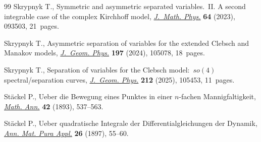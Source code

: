 \documentclass[10pt,a4paper]{amsart}
\numberwithin{equation}{section}
\begin{document}
\begin{thebibliography}{99}
Skrypnyk T., Symmetric and asymmetric separated variables.~{II}. {A} second
 integrable case of the complex {K}irchhoff model,
 \href{https://doi.org/10.1063/5.0152882}{\textit{J.~Math. Phys.}} \textbf{64}
 (2023), 093503, 21~pages.

Skrypnyk T., Asymmetric separation of variables for the extended {C}lebsch and
 {M}anakov models,
 \href{https://doi.org/10.1016/j.geomphys.2023.105078}{\textit{J.~Geom.
 Phys.}} \textbf{197} (2024), 105078, 18~pages.

Skrypnyk T., Separation of variables for the {C}lebsch model:~{$so(4)$}
 spectral/separation curves,
 \href{https://doi.org/10.1016/j.geomphys.2025.105453}{\textit{J.~Geom.
 Phys.}} \textbf{212} (2025), 105453, 11~pages.

St\"ackel P., Ueber die {B}ewegung eines {P}unktes in einer {$n$}-fachen
 {M}annigfaltigkeit, \href{https://doi.org/10.1007/BF01447379}{\textit{Math.
 Ann.}} \textbf{42} (1893), 537--563.

St\"ackel P., Ueber quadratische Integrale der Differentialgleichungen der
 Dynamik, \href{https://doi.org/10.1007/BF02580501}{\textit{Ann. Mat. Pura
 Appl.}} \textbf{26} (1897), 55--60.

\end{thebibliography}
\end{document}

